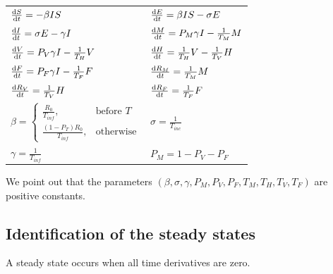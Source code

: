 \documentclass[11pt]{article}
\begin{document}
\begin{table}[H]
  \centering
  \renewcommand{\arraystretch}{2}
  \begin{tabular}{ll}
    $\dv{S}{t} = - \beta I S$ & $\dv{E}{t} = \beta I S - \sigma E$ \\[10pt]
    
    $\dv{I}{t} = \sigma E - \gamma I$ & $\dv{M}{t} = P_M \gamma I - \frac{1}{T_M} M$ \\[10pt]

    $\dv{V}{t} = P_V \gamma I - \frac{1}{T_H} V$ & $\dv{H}{t} = \frac{1}{T_H} V - \frac{1}{T_V} H$ \\[10pt]

    $\dv{F}{t} = P_F \gamma I - \frac{1}{T_F} F$ & $\dv{R_M}{t} = \frac{1}{T_M} M$ \\[10pt]

    $\dv{R_V}{t} = \frac{1}{T_V} H$ & $\dv{R_F}{t} = \frac{1}{T_F} F$ \\[10pt]
    
    $\beta = 
    \begin{cases}
        \frac{R_0}{T_{inf}}, & \text{before } T\\
        \frac{(1-P_T) R_0}{T_{inf}}, & \text{otherwise}
    \end{cases}$ & $\sigma = \frac{1}{T_{inc}}$ \\
    $\gamma = \frac{1}{T_{inf}}$ & $P_M = 1 - P_V - P_F$ \\
  \end{tabular}
\end{table}

We point out that the parameters $(\beta, \sigma, \gamma, P_M, P_V, P_F, T_M, T_H, T_V, T_F)$ are positive constants.

\subsection{Identification of the steady states}

A steady state occurs when all time derivatives are zero.
\end{document}
